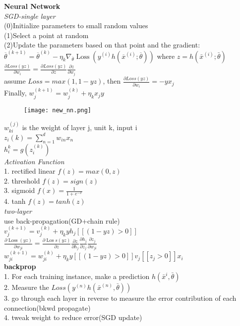 \documentclass[10pt, letterpaper]{article}
\begin{document}
\begin{multicols*}{2}
\noindent\textbf{Neural Network}\\
\emph{SGD-single layer}\\
(0)Initialize parameters to small random values\\
(1)Select a point at random\\
(2)Update the parameters based on that point and the gradient:\\
$\overline{\theta}^{(k+1)}=\overline{\theta}^{(k)}-\eta_{k} \nabla_{\overline{\theta}} \operatorname{Loss}\left(y^{(i)} h\left(\overline{x}^{(i)} ; \overline{\theta}\right)\right)$ where $z=h(\bar x^{(i)};\bar\theta)$\\
$\frac{\partial Loss(yz)}{\partial w_i}=\frac{\partial Loss(yz)}{\partial z}\frac{\partial z}{\partial w_j}$\\
assume $Loss=max(1,1-yz)$, then $\frac{\partial Loss(yz)}{\partial w_i}=-yx_j$
\\Finally, $w_{j}^{(k+1)}=w_{j}^{(k)}+\eta_{k} x_{j} y$
\begin{figure}[H]
    \texttt{[image: new\_nn.png]}
\end{figure}
\noindent$w_{ki}^{(j)}$ is the weight of layer j, unit k, input i\\
$z_i(k)=\sum_{n = 1}^{d}w_{in}x_n$\\
$h_i^{k} = g(z_i^{(k)})$\\
\emph{Activation Function}\\
1. rectified linear $f(z)=max(0,z)$\\
2. threshold $f(z)=sign(z)$\\
3. sigmoid $f(x)=\frac{1}{1+e^{-x}}$\\
4. tanh $f(z)=tanh(z)$\\
\emph{two-layer}\\
use back-propagation(GD+chain rule)\\
$v_{j}^{(k+1)}=v_{j}^{(k)}+\eta_{k} y h_{j}[[(1-y z)>0]]$\\
$\frac{\partial \operatorname{Loss}(y z)}{\partial w_{j i}}=\frac{\partial \operatorname{Los} s(y z)}{\partial z} \frac{\partial z}{\partial h_{j}} \frac{\partial h_{j}}{\partial z_{j}} \frac{\partial z_{j}}{\partial w_{j i}}$\\
$w_{j i}^{(k+1)}=w_{j i}^{(k)}+\eta_{k} y[[(1-y z)>0]] v_{j}\left[\left[z_{j}>0\right]\right] x_{i}$\\
\noindent\textbf{backprop}\\
1. For each training instance, make a prediction $h(\bar x^{i},\bar\theta)$\\
2. Measure the $Loss(y^{(n)}h(\bar x^{(n)}, \bar\theta))$\\
3. go through each layer in reverse to measure the error contribution of each connection(bkwd propagate)\\
4. tweak weight to reduce error(SGD update)



\end{multicols*}
\end{document}
